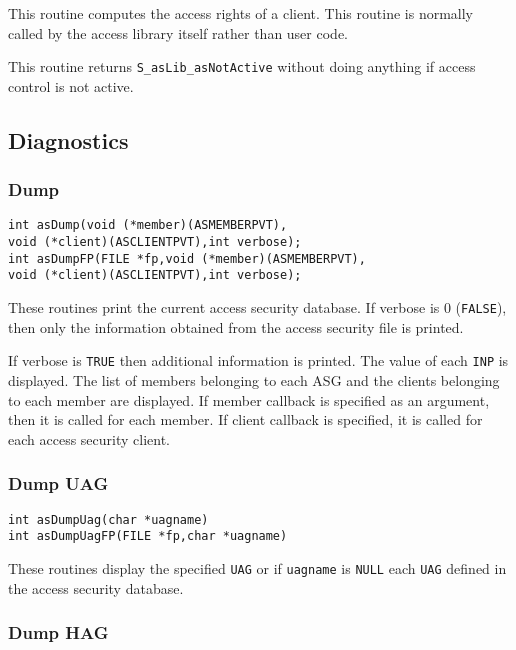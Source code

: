 This routine computes the access rights of a client.
This routine is normally called by the access library itself rather than user code.

This routine returns \verb|S_asLib_asNotActive| without doing anything if access control is not active.

\subsection{Diagnostics}

\subsubsection{Dump}

\begin{verbatim}
int asDump(void (*member)(ASMEMBERPVT),
void (*client)(ASCLIENTPVT),int verbose);
int asDumpFP(FILE *fp,void (*member)(ASMEMBERPVT),
void (*client)(ASCLIENTPVT),int verbose);
\end{verbatim}

These routines print the current access security database.
If verbose is 0 (\verb|FALSE|), then only the information obtained from the access security file is printed.

If verbose is \verb|TRUE| then additional information is printed.
The value of each \verb|INP| is displayed.
The list of members belonging to each ASG and the clients belonging to each member are displayed.
If member callback is specified as an argument, then it is called for each member.
If client callback is specified, it is called for each access security client.

\subsubsection{Dump UAG}

\begin{verbatim}
int asDumpUag(char *uagname)
int asDumpUagFP(FILE *fp,char *uagname)
\end{verbatim}

These routines display the specified \verb|UAG| or if \verb|uagname| is \verb|NULL| each \verb|UAG| defined in the access security database.

\subsubsection{Dump HAG}

